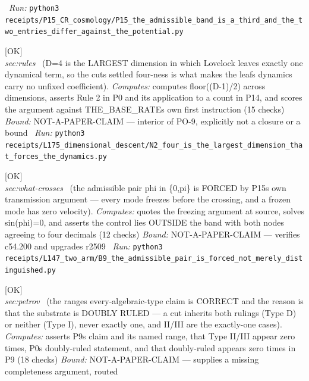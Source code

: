\begin{description}
\ \emph{Run:} \texttt{python3 receipts/P15\_CR\_cosmology/P15\_the\_admissible\_band\_is\_a\_third\_and\_the\_two\_entries\_differ\_against\_the\_potential.py}
\item[\label{rcpt:N2_four_is_the_largest_dimension_that_forces_the_dynamics}\texttt{N2\_four\_is\_the\_largest\_dimension\_that\_forces\_the\_dynamics}]\hfill\textsf{[OK]}\\
\textit{sec:rules} \ (D=4 is the LARGEST dimension in which Lovelock leaves exactly one dynamical term, so the cuts settled four-ness is what makes the leafs dynamics carry no unfixed coefficient). 
\emph{Computes:} computes floor((D-1)/2) across dimensions, asserts Rule 2 in P0 and its application to a count in P14, and scores the argument against THE\_BASE\_RATEs own first instruction (15 checks)
 \emph{Bound:} NOT-A-PAPER-CLAIM --- interior of PO-9, explicitly not a closure or a bound
\ \emph{Run:} \texttt{python3 receipts/L175\_dimensional\_descent/N2\_four\_is\_the\_largest\_dimension\_that\_forces\_the\_dynamics.py}
\item[\label{rcpt:B9_the_admissible_pair_is_forced_not_merely_distinguished}\texttt{B9\_the\_admissible\_pair\_is\_forced\_not\_merely\_distinguished}]\hfill\textsf{[OK]}\\
\textit{sec:what-crosses} \ (the admissible pair phi in \{0,pi\} is FORCED by P15s own transmission argument --- every mode freezes before the crossing, and a frozen mode has zero velocity). 
\emph{Computes:} quotes the freezing argument at source, solves sin(phi)=0, and asserts the control lies OUTSIDE the band with both nodes agreeing to four decimals (12 checks)
 \emph{Bound:} NOT-A-PAPER-CLAIM --- verifies c54.200 and upgrades r2509
\ \emph{Run:} \texttt{python3 receipts/L147\_two\_arm/B9\_the\_admissible\_pair\_is\_forced\_not\_merely\_distinguished.py}
\item[\label{rcpt:P1_the_petrov_interval_is_complete_because_the_substrate_is_doubly_ruled}\texttt{P1\_the\_petrov\_interval\_is\_complete\_because\_the\_substrate\_is\_doubly\_ruled}]\hfill\textsf{[OK]}\\
\textit{sec:petrov} \ (the ranges every-algebraic-type claim is CORRECT and the reason is that the substrate is DOUBLY RULED --- a cut inherits both rulings (Type D) or neither (Type I), never exactly one, and II/III are the exactly-one cases). 
\emph{Computes:} asserts P9s claim and its named range, that Type II/III appear zero times, P0s doubly-ruled statement, and that doubly-ruled appears zero times in P9 (18 checks)
 \emph{Bound:} NOT-A-PAPER-CLAIM --- supplies a missing completeness argument, routed

\end{description}
